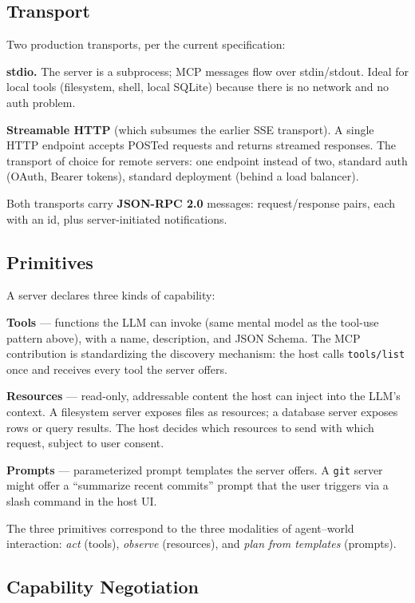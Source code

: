 \subsection{Transport}

Two production transports, per the current specification:

\textbf{stdio.} The server is a subprocess; MCP messages flow
over stdin/stdout. Ideal for local tools (filesystem, shell,
local SQLite) because there is no network and no auth problem.

\textbf{Streamable HTTP} (which subsumes the earlier SSE
transport). A single HTTP endpoint accepts POSTed requests and
returns streamed responses. The transport of choice for remote
servers: one endpoint instead of two, standard auth (OAuth,
Bearer tokens), standard deployment (behind a load balancer).

Both transports carry \textbf{JSON-RPC 2.0}
\citep{json_rpc_spec} messages: request/response pairs, each
with an id, plus server-initiated notifications.

\subsection{Primitives}

A server declares three kinds of capability:

\textbf{Tools} --- functions the LLM can invoke (same mental
model as the tool-use pattern above), with a name, description,
and JSON Schema. The MCP contribution is standardizing the
discovery mechanism: the host calls \texttt{tools/list} once and
receives every tool the server offers.

\textbf{Resources} --- read-only, addressable content the host
can inject into the LLM's context. A filesystem server exposes
files as resources; a database server exposes rows or query
results. The host decides which resources to send with which
request, subject to user consent.

\textbf{Prompts} --- parameterized prompt templates the server
offers. A \texttt{git} server might offer a ``summarize recent
commits'' prompt that the user triggers via a slash command in
the host UI.

The three primitives correspond to the three modalities of
agent--world interaction: \emph{act} (tools), \emph{observe}
(resources), and \emph{plan from templates} (prompts).

\subsection{Capability Negotiation}

